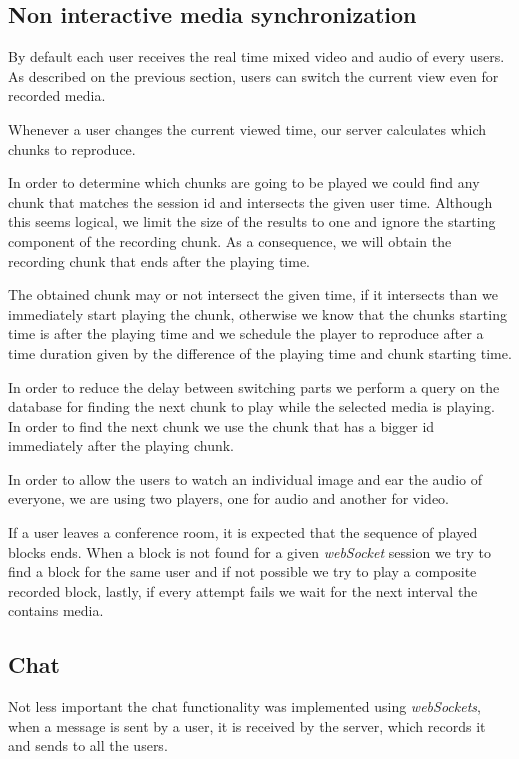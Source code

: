 \subsection{Non interactive media synchronization}
		By default each user receives the real time mixed video and audio of every users. As described on the previous section, users can switch the current view even for recorded media.

		Whenever a user changes the current viewed time, our server calculates which chunks to reproduce.

		In order to determine which chunks are going to be played we could find any chunk that matches the session id and intersects the given user time. Although this seems logical, we limit the size of the results to one and ignore the starting component of the recording chunk. As a consequence, we will obtain the recording chunk that ends after the playing time.

		The obtained chunk may or not intersect the given time, if it intersects than we immediately start playing the chunk, otherwise we know that the chunks starting time is after the playing time and we schedule the player to reproduce after a time duration given by the difference of the playing time and chunk starting time.

		In order to reduce the delay between switching parts we perform a query on the database for finding the next chunk to play while the selected media is playing. In order to find the next chunk we use the chunk that has a bigger id immediately after the playing chunk.

		In order to allow the users to watch an individual image and ear the audio of everyone, we are using two players, one for audio and another for video. 

		If a user leaves a conference room, it is expected that the sequence of played blocks ends. When a block is not found for a given \emph{webSocket} session we try to find a block for the same user and if not possible we try to play a composite recorded block, lastly, if every attempt fails we wait for the next interval the contains media.

\subsection{Chat}
		Not less important the chat functionality was implemented using \emph{webSockets}, when a message is sent by a user, it is received by the server, which records it and sends to all the users.


